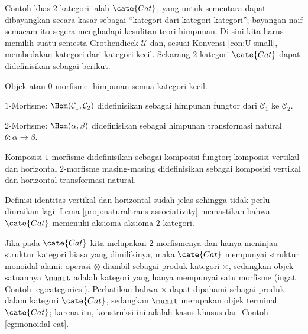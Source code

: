 \begin{example}\label{eg:Cat}
	Contoh khas $2$-kategori ialah $\cate{Cat}$, yang untuk sementara dapat dibayangkan secara kasar sebagai ``kategori dari kategori-kategori''; bayangan naif semacam itu segera menghadapi kesulitan teori himpunan. Di sini kita harus memilih suatu semesta Grothendieck $\mathcal{U}$ dan, sesuai Konvensi \ref{con:U-small}, membedakan kategori dari kategori kecil. Sekarang $2$-kategori $\cate{Cat}$ dapat didefinisikan sebagai berikut.
	\begin{compactitem}
		\item Objek atau $0$-morfisme: himpunan semua kategori kecil.
		\item $1$-Morfisme: $\Hom(\mathcal{C}_1, \mathcal{C}_2)$ didefinisikan sebagai himpunan fungtor dari $\mathcal{C}_1$ ke $\mathcal{C}_2$.
		\item $2$-Morfisme: $\Hom(\alpha, \beta)$ didefinisikan sebagai himpunan transformasi natural $\theta: \alpha \to \beta$.
		\item Komposisi $1$-morfisme didefinisikan sebagai komposisi fungtor; komposisi vertikal dan horizontal $2$-morfisme masing-masing didefinisikan sebagai komposisi vertikal dan horizontal transformasi natural.
	\end{compactitem}
	Definisi identitas vertikal dan horizontal sudah jelas sehingga tidak perlu diuraikan lagi. Lema \ref{prop:naturaltrans-associativity} memastikan bahwa $\cate{Cat}$ memenuhi aksioma-aksioma $2$-kategori.
\end{example}

Jika pada $\cate{Cat}$ kita melupakan $2$-morfismenya dan hanya meninjau struktur kategori biasa yang dimilikinya, maka $\cate{Cat}$ mempunyai struktur monoidal alami: operasi $\otimes$ diambil sebagai produk kategori $\times$, sedangkan objek satuannya $\munit$ adalah kategori yang hanya mempunyai satu morfisme (ingat Contoh \ref{eg:categories}). Perhatikan bahwa $\times$ dapat dipahami sebagai produk dalam kategori $\cate{Cat}$, sedangkan $\munit$ merupakan objek terminal $\cate{Cat}$; karena itu, konstruksi ini adalah kasus khusus dari Contoh \ref{eg:monoidal-cat}.

